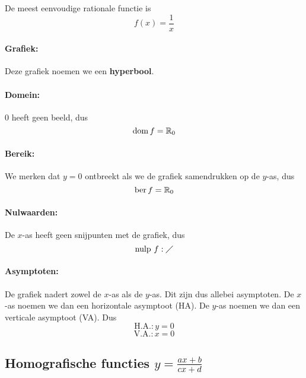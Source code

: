 \documentclass[12pt,twoside,a4paper]{article}
\begin{document}
De meest eenvoudige rationale functie is
$$f(x) = \dfrac{1}{x}$$

\paragraph{Grafiek:}\vspace*{-1cm}
\begin{center}
\end{center}

Deze grafiek noemen we een {\bf hyperbool}.

\paragraph{Domein:}
0 heeft geen beeld, dus
$$\dom f = \mathbb{R}_0$$

\paragraph{Bereik:}
We merken dat $y=0$ ontbreekt als we de grafiek samendrukken op de $y$-as, dus
$$\ber f = \mathbb{R}_0$$
\paragraph{Nulwaarden:}
De $x$-as heeft geen snijpunten met de grafiek, dus
$$\mbox{nulp } f: \diagup$$

\paragraph{Asymptoten:}
De grafiek nadert zowel de $x$-as als de $y$-as. Dit zijn dus allebei asymptoten. De $x$-as noemen we dan een horizontale asymptoot (HA). De $y$-as noemen we dan een verticale asymptoot (VA). Dus
$$\text{H.A.}: y=0$$
$$\text{V.A.}: x=0$$

\subsection{Homografische functies $y=\frac{ax+b}{cx+d}$}
\end{document}
